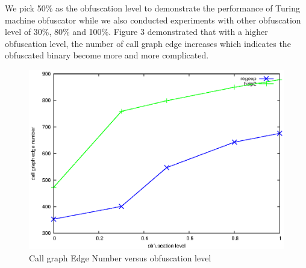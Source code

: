 \documentclass[lnicst]{svmultln}
\begin{document}
We pick 50\% as the obfuscation level to demonstrate the performance of Turing machine obfuscator while we also conducted experiments with other obfuscation level of 30\%, 80\% and 100\%. Figure 3 demonstrated that with a higher obfuscation level,  the number of call graph edge increases which indicates the obfuscated binary become more and more complicated. 
\begin{figure}
  \includegraphics[width=0.9\linewidth]{cg.eps}
  \caption{Call graph Edge Number versus obfuscation level}
  \label{Figure 3}
\end{figure}
\end{document}
